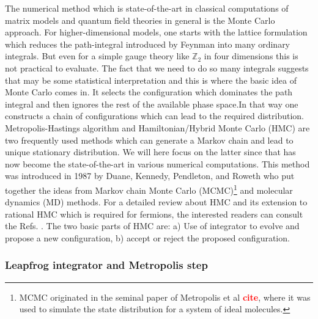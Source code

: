 \documentclass[11pt]{article}
\newcommand{\TODO}[1]{\textcolor{red}{{\bf #1}}}
\begin{document}
The numerical method which is state-of-the-art in classical computations 
of matrix models and quantum field theories in general is the Monte Carlo approach.
For higher-dimensional models, one starts with the lattice formulation which reduces the 
path-integral introduced by Feynman into many ordinary integrals. But even for a simple
gauge theory like $\mathbb{Z}_{2}$ in four dimensions this is not practical to evaluate. 
The fact that we need to do so many integrals suggests that may be some statistical 
interpretation and this is where the basic idea of Monte Carlo comes in. It selects the 
configuration which dominates the path integral and then ignores the rest of the available
phase space.In that way one constructs a chain of configurations which can lead to the 
required distribution. Metropolis-Hastings algorithm and Hamiltonian/Hybrid Monte Carlo (HMC) 
are two frequently used methods which 
can generate a Markov chain and lead to unique stationary distribution. 
We will here focus on the latter since that has now become the state-of-the-art in 
various numerical computations. This method was introduced in 1987 by 
Duane, Kennedy, Pendleton, and Roweth who put together the ideas from
Markov chain Monte Carlo (MCMC)\footnote{MCMC originated in the seminal paper of Metropolis et al
\TODO{cite}, where it was used to simulate the state distribution for a system of ideal molecules.} 
and molecular dynamics (MD) methods. For a detailed review about HMC and its extension to
rational HMC which is required for fermions, the interested readers can 
consult the Refs. \cite{Hanada:2018fnp}. The two basic parts of HMC are: 
a) Use of integrator to evolve and propose a new configuration, b) accept or reject
the proposed configuration.  


\subsubsection{Leapfrog integrator and Metropolis step}
\end{document}
